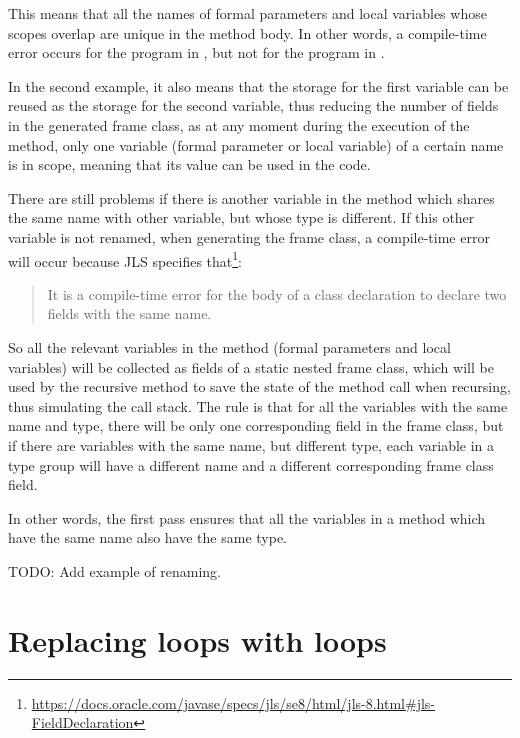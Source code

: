This means that all the names of formal parameters and local variables whose scopes overlap are unique in the method
body. In other words, a compile-time error occurs for the program in
, but not for the program in
.


In the second example, it also means that the storage for the first  variable can be reused as the storage for
the second  variable, thus reducing the number of fields in the generated frame class, as at any moment during
the execution of the method, only one variable (formal parameter or local variable) of a certain name is in scope,
meaning that its value can be used in the code.

There are still problems if there is another variable in the method which shares the same name with other variable, but
whose type is different. If this other variable is not renamed, when generating the frame class, a compile-time error
will occur because JLS specifies that\footnote{\url{https://docs.oracle.com/javase/specs/jls/se8/html/jls-8.html#jls-FieldDeclaration}}:
\begin{quote}
    It is a compile-time error for the body of a class declaration to declare two fields with the same name.
\end{quote}

So all the relevant variables in the method (formal parameters and local variables) will be collected as fields of a
static nested frame class, which will be used by the recursive method to save the state of the method call when
recursing, thus simulating the call stack. The rule is that for all the variables with the same name and type, there
will be only one corresponding field in the frame class, but if there are variables with the same name, but different
type, each variable in a type group will have a different name and a different corresponding frame class field.

In other words, the first pass ensures that all the variables in a method which have the same name also have the same
type.

TODO: Add example of renaming.

\section{Replacing  loops with  loops}

